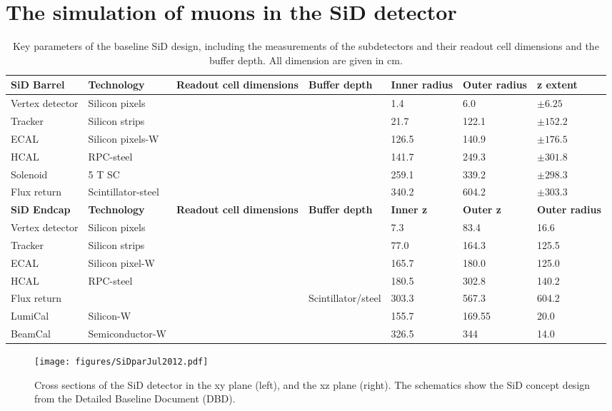 \section{The simulation of muons in the SiD detector}
\label{Detector}

\begin{table}
\caption{Key parameters of the baseline SiD design, including the measurements of the subdetectors and their readout cell dimensions and the buffer depth. All dimension are given in cm.}
\label{tab:KeyParametersSiD}
\begin{tabular}{lllllll}
\hline\hline
\textbf{SiD Barrel} & \textbf{Technology} & \textbf{Readout cell dimensions} & \textbf{Buffer depth} & \textbf{Inner radius} & \textbf{Outer radius} & \textbf{z extent} \\
\hline
Vertex detector & Silicon pixels & & & 1.4 & 6.0 & $\pm 6.25$ \\
Tracker & Silicon strips & & & 21.7 & 122.1 & $\pm 152.2$ \\
ECAL & Silicon pixels-W & & & 126.5 & 140.9 & $\pm 176.5$ \\
HCAL & RPC-steel & & & 141.7 & 249.3 & $\pm 301.8$ \\
Solenoid & 5 T SC & & & 259.1 & 339.2 & $\pm 298.3$ \\
Flux return & Scintillator-steel & & & 340.2 & 604.2 & $\pm 303.3$ \\
\hline
\textbf{SiD Endcap} & \textbf{Technology} & \textbf{Readout cell dimensions} & \textbf{Buffer depth} & \textbf{Inner z} & \textbf{Outer z} & \textbf{Outer radius} \\
\hline
Vertex detector & Silicon pixels & & & 7.3 & 83.4 & 16.6 \\
Tracker & Silicon strips & & & 77.0 & 164.3 & 125.5 \\
ECAL & Silicon pixel-W & & & 165.7 & 180.0 & 125.0 \\
HCAL & RPC-steel & & & 180.5 & 302.8 & 140.2 \\
Flux return & & & Scintillator/steel & 303.3 & 567.3 & 604.2 \\
LumiCal & Silicon-W & & & 155.7 & 169.55 &  20.0 \\
BeamCal & Semiconductor-W & & & 326.5 & 344 & 14.0 \\
\hline\hline
\end{tabular}
\end{table}

\begin{figure}
    \centering
    \texttt{[image: figures/SiDparJul2012.pdf]}
    \caption[SiD detector cross sections]{
    Cross sections of the SiD detector in the xy plane (left), and the xz plane (right).
    The schematics show the SiD concept design from the Detailed Baseline Document (DBD).
    }
    \label{fig:SiD}
\end{figure}

